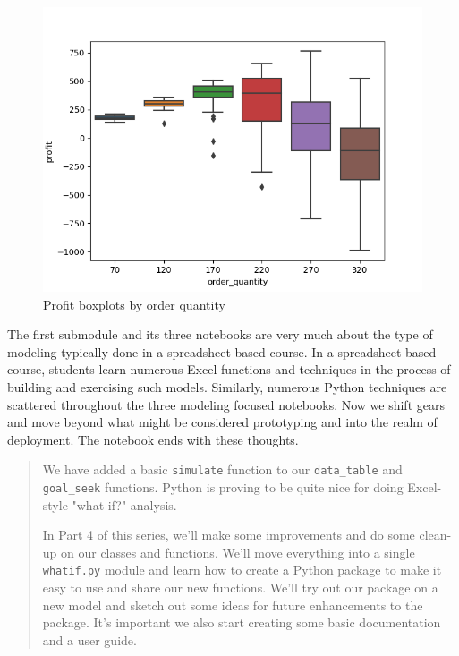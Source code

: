\documentclass[ited,blindrev]{informs3}              %
\newcommand{\code}[1]{\texttt{#1}}
\begin{document}
\begin{figure}[!ht]
	\centering
	\begin{minipage}{.80\textwidth}
		\includegraphics[width=1.0\textwidth]{images/boxplots.png}
	\end{minipage}
	\caption{Profit boxplots by order quantity}
	\label{fig:2way_dt}
\end{figure}

The first submodule and its three notebooks are very much about the type of modeling typically done in a spreadsheet based course. In a spreadsheet based course, students learn numerous Excel functions and techniques in the process of building and exercising such models. Similarly, numerous Python techniques are scattered throughout the three modeling focused notebooks. Now we shift gears and move beyond what might be considered prototyping and into the realm of deployment. The notebook ends with these thoughts.

\begin{tcolorbox}
	\begin{quotation}
		
\textsf{We have added a basic \code{simulate} function to our \code{data\_table} and \code{goal\_seek} functions. Python is proving to be quite nice for doing Excel-style "what if?" analysis.} 

\textsf{In Part 4 of this series, we'll make some improvements and do some clean-up on our classes and functions. We'll move everything into a single \code{whatif.py} module and learn how to create a Python package to make it easy to use and share our new functions. We'll try out our package on a new model and sketch out some ideas for future enhancements to the package. It's important we also start creating some basic documentation and a user guide.}
\end{quotation}
\end{tcolorbox}
\end{document}
